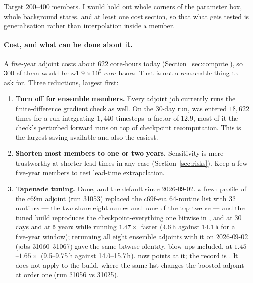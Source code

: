 Target $200$--$400$ members. I would hold out whole corners of the parameter
box, whole background states, and at least one cost section, so that what gets
tested is generalisation rather than interpolation inside a member.

\paragraph{Cost, and what can be done about it.}
A five-year adjoint costs about $622$ core-hours today
(Section~\ref{sec:compute}), so $300$ of them would
be $\sim\!1.9\times10^{5}$ core-hours. That is not a reasonable thing to ask
for. Three reductions, largest first:

\begin{enumerate}
  \item \textbf{Turn off  for ensemble members.} Every adjoint
        job currently runs the finite-difference gradient check as well. On the
        30-day run,  was entered $18{,}622$ times for a run
        integrating $1{,}440$ timesteps, a factor of $12.9$, most of it the
        check's perturbed forward runs on top of checkpoint recomputation. This
        is the largest saving available and also the easiest.
  \item \textbf{Shorten most members to one or two years.} Sensitivity is more
        trustworthy at shorter lead times in any case
        (Section~\ref{sec:risks}). Keep a few five-year members to test
        lead-time extrapolation.
  \item \textbf{Tapenade  tuning.} Done, and the default
        since 2026-09-02: a fresh profile of the c69m adjoint (run 31053)
        replaced the c69f-era 64-routine list with 33 routines --- the two
        share eight names and none of the top twelve --- and the tuned build
        reproduces the checkpoint-everything one bitwise in ,
         and  at 30 days and at 5 years while
        running $1.47\times$ faster (9.6\,h against 14.1\,h for a five-year
        window); rerunning all eight ensemble adjoints with it on 2026-09-02
        (jobs 31060--31067) gave the same bitwise identity, blow-ups included,
        at $1.45$--$1.65\times$ (9.5--9.75\,h against 14.0--15.7\,h).
         now points at it; the record is
        . It does not apply to the
         build, where the same list changes the boosted
        adjoint at order one (run 31056 vs 31025).
\end{enumerate}

